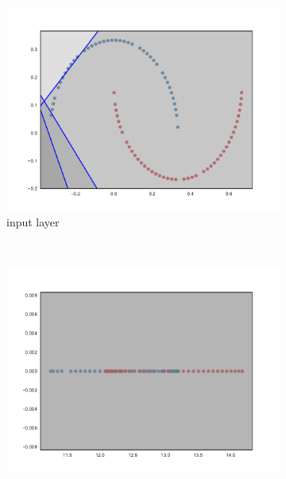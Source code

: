 \begin{figure}[h!]
\begin{subfigure}[b]{0.3\textwidth}
        \label{fig:reluBNInit502}
    \end{subfigure}
    \\
    \begin{subfigure}[b]{0.3\textwidth}
        \includegraphics[width=\textwidth]{img/init/layerwise/conv2d_1-0.pdf}
        \caption{\SepLayer input layer}
        \label{fig:layerwiseInitInput}
    \end{subfigure}
    ~ %
    \begin{subfigure}[b]{0.3\textwidth}
        \includegraphics[width=\textwidth]{img/init/layerwise/conv2d_50-0.pdf}

\end{subfigure}
\end{figure}
